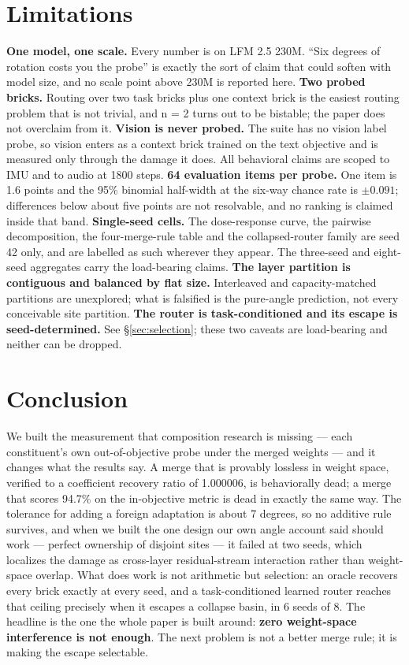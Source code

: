 \documentclass[11pt]{article}
\begin{document}
\section{Limitations}
\textbf{One model, one scale.} Every number is on LFM 2.5 230M. ``Six degrees of rotation costs you the probe'' is exactly the sort of claim that could soften with model size, and no scale point above 230M is reported here.
\textbf{Two probed bricks.} Routing over two task bricks plus one context brick is the easiest routing problem that is not trivial, and n = 2 turns out to be bistable; the paper does not overclaim from it.
\textbf{Vision is never probed.} The suite has no vision label probe, so vision enters as a context brick trained on the text objective and is measured only through the damage it does. All behavioral claims are scoped to IMU and to audio at 1800 steps.
\textbf{64 evaluation items per probe.} One item is 1.6 points and the 95\% binomial half-width at the six-way chance rate is $\pm0.091$; differences below about five points are not resolvable, and no ranking is claimed inside that band.
\textbf{Single-seed cells.} The dose-response curve, the pairwise decomposition, the four-merge-rule table and the collapsed-router family are seed 42 only, and are labelled as such wherever they appear. The three-seed and eight-seed aggregates carry the load-bearing claims.
\textbf{The layer partition is contiguous and balanced by flat size.} Interleaved and capacity-matched partitions are unexplored; what is falsified is the pure-angle prediction, not every conceivable site partition.
\textbf{The router is task-conditioned and its escape is seed-determined.} See \S\ref{sec:selection}; these two caveats are load-bearing and neither can be dropped.

\section{Conclusion}
We built the measurement that composition research is missing --- each constituent's own out-of-objective probe under the merged weights --- and it changes what the results say. A merge that is provably lossless in weight space, verified to a coefficient recovery ratio of 1.000006, is behaviorally dead; a merge that scores 94.7\% on the in-objective metric is dead in exactly the same way. The tolerance for adding a foreign adaptation is about 7 degrees, so no additive rule survives, and when we built the one design our own angle account said should work --- perfect ownership of disjoint sites --- it failed at two seeds, which localizes the damage as cross-layer residual-stream interaction rather than weight-space overlap. What does work is not arithmetic but selection: an oracle recovers every brick exactly at every seed, and a task-conditioned learned router reaches that ceiling precisely when it escapes a collapse basin, in 6 seeds of 8. The headline is the one the whole paper is built around: \textbf{zero weight-space interference is not enough}. The next problem is not a better merge rule; it is making the escape selectable.
\end{document}
